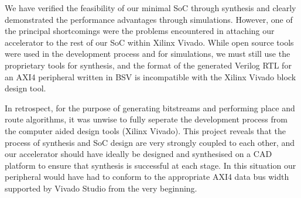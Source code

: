 \documentclass[a4paper,8pt]{report}
\begin{document}
We have verified the feasibility of our minimal SoC through synthesis and clearly
demonstrated the performance advantages through simulations. However, one of the
principal shortcomings were the problems encountered in attaching our
accelerator to the rest of our SoC within Xilinx Vivado. While open source tools
were used in the development process and for simulations, we must still use the
proprietary tools for synthesis, and the format of the generated Verilog RTL for
an AXI4 peripheral written in BSV is incompatible with the Xilinx Vivado block
design tool.

In retrospect, for the purpose of generating bitstreams and performing place and
route algorithms, it was unwise to fully seperate the development process from
the computer aided design tools (Xilinx Vivado). This project reveals that the
process of synthesis and SoC design are very strongly coupled to each other, and
our accelerator should have ideally be designed and synthesised on a CAD
platform to ensure that synthesis is successful at each stage. In this situation
our peripheral would have had to conform to the appropriate AXI4 data bus width
supported by Vivado Studio from the very beginning. 






\appendix
\singlespacing

\printbibliography
\end{document}
